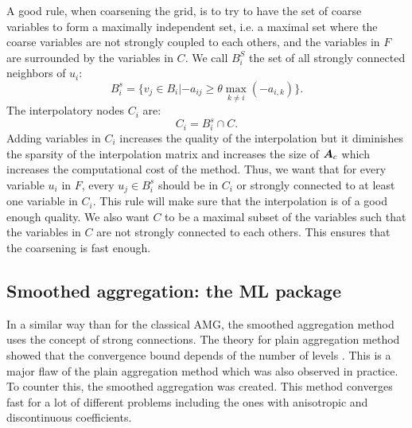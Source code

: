 A good rule, when coarsening the grid, is to try to have the set of coarse 
variables to form a maximally independent set, i.e. a maximal set where the 
coarse variables are not strongly coupled to each others, and the variables 
in $F$ are surrounded by the variables in $C$. We call $B_i^S$ the set of all 
strongly connected neighbors of $u_i$:
\begin{equation}
  B_i^s = \{ v_j \in B_i | -a_{ij} \geq \theta \max_{k\neq i}(-a_{i,k})\}.
\end{equation}
The interpolatory nodes $C_i$ are:
\begin{equation}
  C_i = B_i^s \cap C.
\end{equation}
Adding variables in $C_i$ increases the quality of the interpolation but
it diminishes the sparsity of the interpolation matrix and increases the
size of $\boldsymbol{A}_c$ which increases the computational cost of the method.
Thus, we want that for every variable $u_i$ in $F$, every $u_j \in B_i^s$
should be in $C_i$ or strongly connected to at least one variable in
$C_i$. This rule will make sure that the interpolation is of a good enough
quality. We also want $C$ to be a maximal subset of the variables such that 
the variables in $C$ are not strongly connected to each others. This ensures 
that the coarsening is fast enough.

\subsection{Smoothed aggregation: the ML package}
In a similar way than for the classical AMG, the smoothed aggregation
method uses the concept of strong connections. The theory for plain
aggregation method showed that the convergence bound depends of the number
of levels \cite{amg_unstruc}. This is a major flaw of the plain aggregation
method which was also observed in practice. To counter this, the smoothed
aggregation was created. This method converges fast for a lot of different 
problems including the ones with anisotropic and discontinuous coefficients.
  

